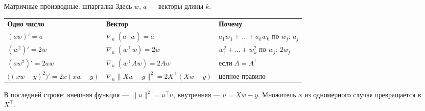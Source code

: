 \begin{frame}[c]{Матричные производные: шпаргалка}
   Здесь $w$, $a$ --- векторы длины $k$.

  \medskip
  \centering
  \small\setlength{\tabcolsep}{5pt}
  \begin{tabular}{lll}
    \textbf{Одно число} & \textbf{Вектор} & \textbf{Почему}\\
    $(a w)' = a$ & $\nabla_w\,(a^\top w) = a$ & $a_1 w_1 + \dots + a_k w_k$ по $w_j$: $a_j$\\
    $(w^2)' = 2w$ & $\nabla_w\,(w^\top w) = 2w$ & $w_1^2 + \dots + w_k^2$ по $w_j$: $2w_j$\\
    $(a w^2)' = 2aw$ & $\nabla_w\,(w^\top A w) = 2Aw$ & если $A = A^\top$\\
    $\bigl((xw - y)^2\bigr)' = 2x(xw-y)$ & $\nabla_w\lVert Xw - y\rVert^2 = 2X^\top(Xw - y)$ & цепное правило\\
  \end{tabular}

  \medskip
  \raggedright\small
  В последней строке: внешняя функция --- $\lVert u\rVert^2 = u^\top u$, внутренняя --- $u = Xw - y$.
  Множитель $x$ из одномерного случая превращается в $X^\top$.
\end{frame}

